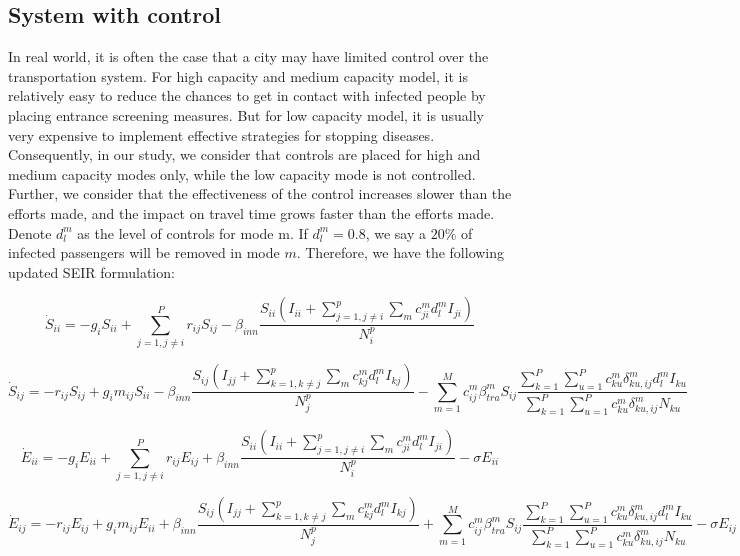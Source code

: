 \documentclass[review]{elsarticle}
\theoremstyle{plain}
\theoremstyle{definition}
\theoremstyle{remark}
\numberwithin{equation}{section}
\theoremstyle{remark}
\begin{document}
\subsection{System with control}
In real world, it is often the case that a city may have limited control over the transportation system. For high capacity and medium capacity model, it is relatively easy to reduce the chances to get in contact with infected people by placing entrance screening measures. But for low capacity model, it is usually very expensive to implement effective strategies for stopping diseases. Consequently, in our study, we consider that controls are placed for high and medium capacity modes only, while the low capacity mode is not controlled. Further, we consider that the effectiveness of the control increases slower than the efforts made, and the impact on travel time grows faster than the efforts made. Denote $d_l^m$ as the level of controls for mode m. If $d_l^m=0.8$, we say a $20\%$ of infected passengers will be removed in mode $m$. Therefore, we have the following updated SEIR formulation:

\begin{equation}
	\dot{S}_{ii}=-g_{i}S_{ii}+\sum_{j=1,j\neq i}^{P}r_{ij}S_{ij}-\beta_{inn}\frac{S_{ii}(I_{ii}+\sum_{j=1,j\neq i}^{p}\sum_m c_{ji}^md_l^mI_{ji})}{N_i^p}
\end{equation}

\begin{equation}
	\dot{S}_{ij}=-r_{ij}S_{ij}+g_i m_{ij}S_{ii}-\beta_{inn}\frac{S_{ij}(I_{jj}+\sum_{k=1,k\neq j}^{p}\sum_m c_{kj}^md_l^mI_{kj})}{N_j^p}-\sum_{m=1}^M c_{ij}^{m} \beta_{tra}^m S_{ij} \frac{\sum_{k=1}^P\sum_{u=1}^P c_{ku}^m \delta_{ku,ij}^m d_l^mI_{ku}}{\sum_{k=1}^P\sum_{u=1}^P c_{ku}^m \delta_{ku,ij}^m N_{ku}}
\end{equation}

\begin{equation}
	\dot{E}_{ii}=-g_{i}E_{ii}+\sum_{j=1,j\neq i}^{P}r_{ij}E_{ij}+\beta_{inn}\frac{S_{ii}(I_{ii}+\sum_{j=1,j\neq i}^{p}\sum_m c_{ji}^md_l^mI_{ji} )}{N_i^p}-\sigma E_{ii}
\end{equation}

\begin{equation}
	\dot{E}_{ij}=-r_{ij}E_{ij}+g_i m_{ij}E_{ii}+\beta_{inn}\frac{S_{ij}(I_{jj}+\sum_{k=1,k\neq j}^{p}\sum_m c_{kj}^md_l^mI_{kj})}{N_j^p}+\sum_{m=1}^M c_{ij}^{m} \beta_{tra}^m S_{ij}\frac{\sum_{k=1}^P\sum_{u=1}^P c_{ku}^m \delta_{ku,ij}^m d_l^mI_{ku}}{\sum_{k=1}^P\sum_{u=1}^P c_{ku}^m \delta_{ku,ij}^m N_{ku}}-\sigma E_{ij}
\end{equation}
\end{document}
